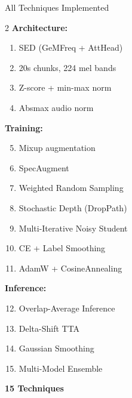 \documentclass[aspectratio=169, 11pt]{beamer}
\begin{document}
\begin{frame}[t]{All Techniques Implemented}
    \footnotesize
    \begin{multicols}{2}
        \textbf{\textcolor{draculapink}{Architecture:}}
        \begin{enumerate}
            \item \tiny SED (GeMFreq + AttHead)
            \item \tiny 20s chunks, 224 mel bands
            \item \tiny Z-score + min-max norm
            \item \tiny Absmax audio norm
        \end{enumerate}

        \textbf{\textcolor{draculapink}{Training:}}
        \begin{enumerate}
            \setcounter{enumi}{4}
            \item \tiny Mixup augmentation
            \item \tiny SpecAugment
            \item \tiny Weighted Random Sampling
            \item \tiny Stochastic Depth (DropPath)
            \item \tiny Multi-Iterative Noisy Student
            \item \tiny CE + Label Smoothing
            \item \tiny AdamW + CosineAnnealing
        \end{enumerate}

        \columnbreak

        \textbf{\textcolor{draculapink}{Inference:}}
        \begin{enumerate}
            \setcounter{enumi}{11}
            \item \tiny Overlap-Average Inference
            \item \tiny Delta-Shift TTA
            \item \tiny Gaussian Smoothing
            \item \tiny Multi-Model Ensemble
        \end{enumerate}

        \vspace{0.2cm}
        \begin{center}
            \begin{tcolorbox}[greenbox_tcb={}, width=3.5cm, center, sharp corners]
                \centering \small \textbf{15 Techniques}
            \end{tcolorbox}
        \end{center}
    \end{multicols}
\end{frame}
\end{document}
